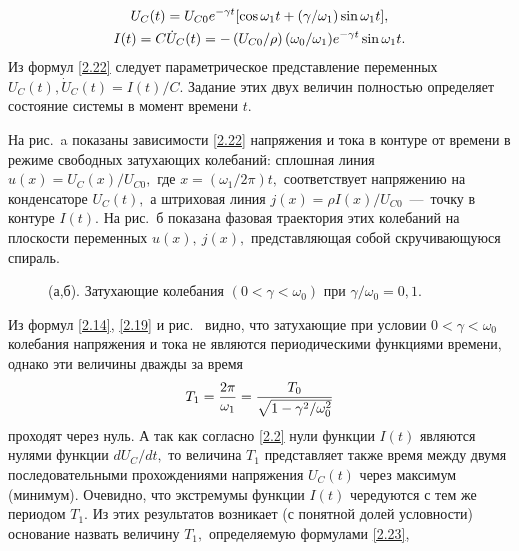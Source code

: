 \begin{equation}
	\eqmark{2.22}
		\begin{gathered}[c]
			U_C(t)=U_{C0}e^{-\gamma t}[\cos\omega_1t+(\gamma/\omega_1)\sin\omega_1t], \\
			I(t)=C\dot{U}_C(t)
=-\left(U_{C0}/\rho\right)(\omega_0/\omega_1)e^{-\gamma t}\sin\omega_1t.
		\end{gathered}
\end{equation}
Из формул \eqref{2.22} следует параметрическое представление  переменных $U_C(t), \dot{U}_C(t)=I(t)/C.$ Задание этих двух величин полностью определяет состояние системы в момент времени $t.$

На рис.~a показаны  зависимости \eqref{2.22} напряжения и тока в контуре от времени в режиме свободных затухающих колебаний: сплошная линия $u(x)=U_C(x)/U_{C0},$ где $x=(\omega_1/2\pi)t,$ соответствует напряжению на конденсаторе $U_C(t),$ а штриховая линия $j(x)=\rho I(x)/U_{C0}$~---~точку в контуре $I(t).$ На рис.~б показана фазовая траектория этих колебаний на плоскости переменных   $u(x),~j(x),$ представляющая собой скручивающуюся спираль.

\begin{figure}[h]
	\begin{minipage}[h]{0.5\linewidth}
	\end{minipage}
	\hfill
	\begin{minipage}[h]{0.5\linewidth}
	\end{minipage}
	\caption{(а,б). Затухающие колебания $(0<\gamma<\omega_0)$ при $\gamma/\omega_0=0,1$.}
\end{figure}

Из формул \eqref{2.14}, \eqref{2.19} и рис.~ видно, что затухающие при условии $0<\gamma<\omega_0$ колебания напряжения и тока не являются периодическими функциями времени, однако эти величины дважды за время
\begin{equation}\eqmark{2.23}
T_1=\dfrac{2\pi}{\omega_1}=\dfrac{T_0}{\sqrt{1-\gamma^2/\omega_0^2}}
\end{equation}
проходят через нуль. А так как согласно \eqref{2.2} нули функции $I(t)$ являются нулями функции $dU_C/dt,$ то величина $T_1$ представляет также время между двумя последовательными прохождениями напряжения $U_C(t)$ через максимум (минимум). Очевидно, что экстремумы функции $I(t)$ чередуются с тем же периодом $T_1.$ Из этих результатов возникает (с понятной долей условности) основание назвать  величину $T_1,$ определяемую формулами \eqref{2.23}, 

